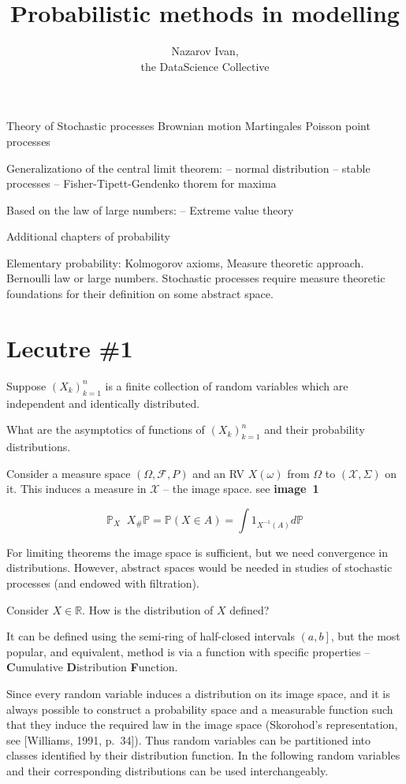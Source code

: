 \documentclass[a4paper]{article}
\title{Probabilistic methods in modelling}
\author{Nazarov Ivan, \rus{101мНОД(ИССА)}\\the DataScience Collective}
\newcommand{\ploc}[1]{{\left ( #1 \right ]}}
\newcommand{\brac}[1]{{\left ( #1 \right )}}
\newcommand{\Real}{\mathbb{R}}
\newcommand{\Xcal}{\mathcal{X}}
\newcommand{\Fcal}{\mathcal{F}}
\newcommand{\defn}{\mathop{\overset{\Delta}{=}}\nolimits}
\begin{document}
\maketitle

Theory of Stochastic processes
Brownian motion
Martingales
Poisson point processes

Generalizationo of the central limit theorem:
-- normal distribution
-- stable processes
-- Fisher-Tipett-Gendenko thorem for maxima

Based on the law of large numbers:
-- Extreme value theory

Additional chapters of probability

Elementary probability: Kolmogorov axioms, Measure theoretic approach.
Bernoulli law or large numbers.
Stochastic processes require measure theoretic foundations for their definition on some abstract space.

\section{Lecutre \#1} %
\label{sec:lecutre_1}


Suppose $\brac{X_k}_{k=1}^n$ is a finite collection of random variables which are independent and identically distributed.

What are the asymptotics of functions of $\brac{X_k}_{k=1}^n$ and their probability distributions.

Consider a measure space $(\Omega, \Fcal, P)$ and an RV $X(\omega)$ from $\Omega$ to $(\Xcal, \Sigma)$ on it.
This induces a measure in $\Xcal$ -- the image space. see \textbf{image~1}

\[\mathbb{P}_X \defn X_\# \mathbb{P} = \mathbb{P}\brac{X\in A} = \int 1_{X^{-1}(A)}d\mathbb{P}\]

For limiting theorems the image space is sufficient, but we need convergence in distributions. However, abstract spaces would be needed in studies of stochastic processes (and endowed with filtration).

Consider $X\in \Real$.
How is the distribution of $X$ defined?

It can be defined using the semi-ring of half-closed intervals $\ploc{a,b}$, but the most popular, and equivalent, method is via a function with specific properties -- \textbf{C}umulative \textbf{D}istribution \textbf{F}unction.

Since every random variable induces a distribution on its image space, and it is always possible to construct a probability space and a measurable function such that they induce the required law in the image space (Skorohod's representation, see [Williams, 1991, p.~34]).
Thus random variables can be partitioned into classes identified by their distribution function.
In the following random variables and their corresponding distributions can be used interchangeably.
\end{document}
